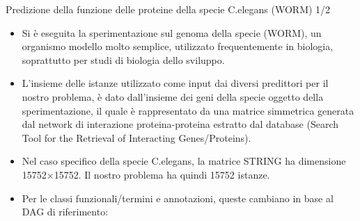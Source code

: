 \documentclass[9pt]{beamer}
\begin{document}
\begin{tframe}{Predizione della funzione delle proteine della specie C.elegans (WORM) 1/2}
\begin{itemize}
\item Si è eseguita la sperimentazione sul genoma della specie
 (WORM), un organismo modello molto semplice, utilizzato frequentemente in biologia, soprattutto per studi di biologia dello sviluppo.
\item L’insieme delle istanze utilizzato come input dai diversi predittori per il nostro problema, è dato dall’insieme dei geni della specie oggetto della sperimentazione, il quale è rappresentato da una matrice simmetrica generata dal network di interazione proteina-proteina estratto dal database  (Search Tool for the Retrieval of Interacting Genes/Proteins).
\item Nel caso specifico della specie C.elegans, la matrice STRING ha dimensione 15752×15752. Il nostro problema ha quindi 15752 istanze.
\item Per le classi funzionali/termini e annotazioni, queste cambiano in base al DAG di riferimento:

\begin{table}[h]
\centering
{}

\label{DAG_desc}
\end{table}
\end{itemize}
\end{tframe}
\end{document}
